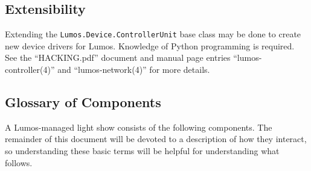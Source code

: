 \documentclass{article}
\begin{document}
\subsection{Extensibility}
Extending the {\tt Lumos.Device.ControllerUnit}
base class may be done to create new device drivers for Lumos.
Knowledge of Python programming is required.  See the
``HACKING.pdf'' document and manual page entries ``lumos-controller(4)''
and ``lumos-network(4)'' for more details.

\subsection{Glossary of Components}
A Lumos-managed light show consists of the following components.  The
remainder of this document will be devoted to a description of how they
interact, so understanding these basic terms will be helpful for understanding
what follows.
\end{document}
